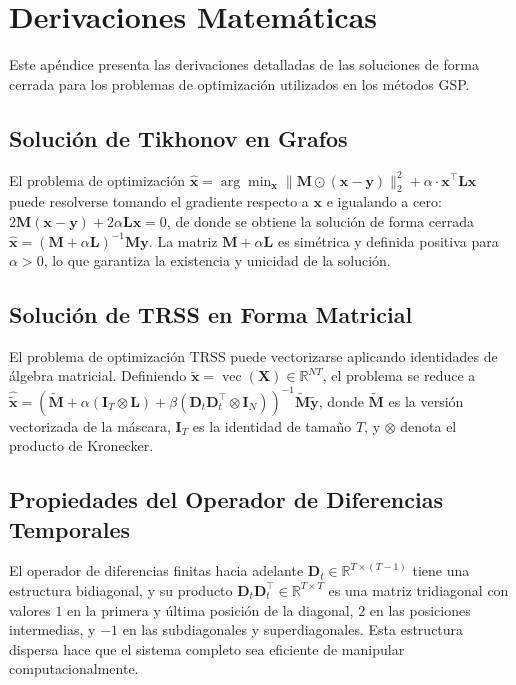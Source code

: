 \chapter{Derivaciones Matemáticas}
\label{ap:derivaciones}

Este apéndice presenta las derivaciones detalladas de las soluciones de forma cerrada para los problemas de optimización utilizados en los métodos GSP.

\section{Solución de Tikhonov en Grafos}

El problema de optimización $\hat{\mathbf{x}} = \arg\min_{\mathbf{x}} \|\mathbf{M} \odot (\mathbf{x} - \mathbf{y})\|_2^2 + \alpha \cdot \mathbf{x}^\top \mathbf{L} \mathbf{x}$ puede resolverse tomando el gradiente respecto a $\mathbf{x}$ e igualando a cero: $2\mathbf{M}(\mathbf{x} - \mathbf{y}) + 2\alpha \mathbf{L} \mathbf{x} = 0$, de donde se obtiene la solución de forma cerrada $\hat{\mathbf{x}} = (\mathbf{M} + \alpha \mathbf{L})^{-1} \mathbf{M}\mathbf{y}$. La matriz $\mathbf{M} + \alpha \mathbf{L}$ es simétrica y definida positiva para $\alpha > 0$, lo que garantiza la existencia y unicidad de la solución.

\section{Solución de TRSS en Forma Matricial}

El problema de optimización TRSS puede vectorizarse aplicando identidades de álgebra matricial. Definiendo $\tilde{\mathbf{x}} = \operatorname{vec}(\mathbf{X}) \in \mathbb{R}^{NT}$, el problema se reduce a $\hat{\tilde{\mathbf{x}}} = (\tilde{\mathbf{M}} + \alpha(\mathbf{I}_T \otimes \mathbf{L}) + \beta(\mathbf{D}_t \mathbf{D}_t^\top \otimes \mathbf{I}_N))^{-1} \tilde{\mathbf{M}} \tilde{\mathbf{y}}$, donde $\tilde{\mathbf{M}}$ es la versión vectorizada de la máscara, $\mathbf{I}_T$ es la identidad de tamaño $T$, y $\otimes$ denota el producto de Kronecker.

\section{Propiedades del Operador de Diferencias Temporales}

El operador de diferencias finitas hacia adelante $\mathbf{D}_t \in \mathbb{R}^{T \times (T-1)}$ tiene una estructura bidiagonal, y su producto $\mathbf{D}_t \mathbf{D}_t^\top \in \mathbb{R}^{T \times T}$ es una matriz tridiagonal con valores $1$ en la primera y última posición de la diagonal, $2$ en las posiciones intermedias, y $-1$ en las subdiagonales y superdiagonales. Esta estructura dispersa hace que el sistema completo sea eficiente de manipular computacionalmente.

